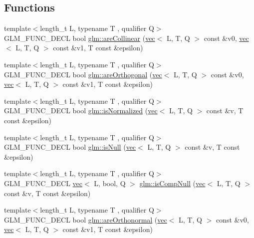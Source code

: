 \subsection*{Functions}
\begin{DoxyCompactItemize}
\item 
{\footnotesize template$<$length\+\_\+t L, typename T , qualifier Q$>$ }\\G\+L\+M\+\_\+\+F\+U\+N\+C\+\_\+\+D\+E\+CL bool \hyperlink{group__gtx__vector__query_ga13da4a787a2ff70e95d561fb19ff91b4}{glm\+::are\+Collinear} (\hyperlink{structglm_1_1vec}{vec}$<$ L, T, Q $>$ const \&v0, \hyperlink{structglm_1_1vec}{vec}$<$ L, T, Q $>$ const \&v1, T const \&epsilon)
\item 
{\footnotesize template$<$length\+\_\+t L, typename T , qualifier Q$>$ }\\G\+L\+M\+\_\+\+F\+U\+N\+C\+\_\+\+D\+E\+CL bool \hyperlink{group__gtx__vector__query_gac7b95b3f798e3c293262b2bdaad47c57}{glm\+::are\+Orthogonal} (\hyperlink{structglm_1_1vec}{vec}$<$ L, T, Q $>$ const \&v0, \hyperlink{structglm_1_1vec}{vec}$<$ L, T, Q $>$ const \&v1, T const \&epsilon)
\item 
{\footnotesize template$<$length\+\_\+t L, typename T , qualifier Q$>$ }\\G\+L\+M\+\_\+\+F\+U\+N\+C\+\_\+\+D\+E\+CL bool \hyperlink{group__gtx__vector__query_gac3c974f459fd75453134fad7ae89a39e}{glm\+::is\+Normalized} (\hyperlink{structglm_1_1vec}{vec}$<$ L, T, Q $>$ const \&v, T const \&epsilon)
\item 
{\footnotesize template$<$length\+\_\+t L, typename T , qualifier Q$>$ }\\G\+L\+M\+\_\+\+F\+U\+N\+C\+\_\+\+D\+E\+CL bool \hyperlink{group__gtx__vector__query_gab4a3637dbcb4bb42dc55caea7a1e0495}{glm\+::is\+Null} (\hyperlink{structglm_1_1vec}{vec}$<$ L, T, Q $>$ const \&v, T const \&epsilon)
\item 
{\footnotesize template$<$length\+\_\+t L, typename T , qualifier Q$>$ }\\G\+L\+M\+\_\+\+F\+U\+N\+C\+\_\+\+D\+E\+CL \hyperlink{structglm_1_1vec}{vec}$<$ L, bool, Q $>$ \hyperlink{group__gtx__vector__query_gaf6ec1688eab7442fe96fe4941d5d4e76}{glm\+::is\+Comp\+Null} (\hyperlink{structglm_1_1vec}{vec}$<$ L, T, Q $>$ const \&v, T const \&epsilon)
\item 
{\footnotesize template$<$length\+\_\+t L, typename T , qualifier Q$>$ }\\G\+L\+M\+\_\+\+F\+U\+N\+C\+\_\+\+D\+E\+CL bool \hyperlink{group__gtx__vector__query_ga1b091c3d7f9ee3b0708311c001c293e3}{glm\+::are\+Orthonormal} (\hyperlink{structglm_1_1vec}{vec}$<$ L, T, Q $>$ const \&v0, \hyperlink{structglm_1_1vec}{vec}$<$ L, T, Q $>$ const \&v1, T const \&epsilon)
\end{DoxyCompactItemize}


